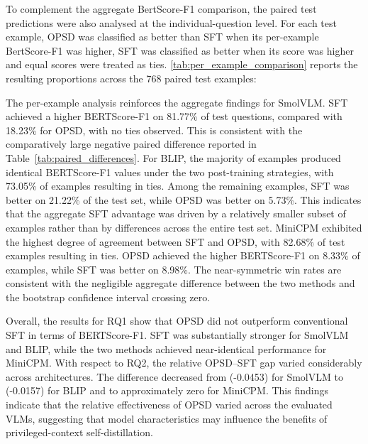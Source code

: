 To complement the aggregate BertScore-F1 comparison, the paired test predictions were
also analysed at the individual-question level. For each test example, OPSD was classified
as better than SFT when its per-example BertScore-F1 was higher, SFT was classified as better
when its score was higher and equal scores were treated as ties. \autoref{tab:per_example_comparison}
reports the resulting proportions across the 768 paired test examples:

\begin{table}[h!]
\centering
\caption{Per-example BERTScore-F1 comparison between OPSD and SFT.}
\label{tab:per_example_comparison}
\end{table}

The per-example analysis reinforces the aggregate findings for SmolVLM. SFT achieved a 
higher BERTScore-F1 on 81.77\% of test questions, compared with 18.23\% for OPSD, with 
no ties observed. This is consistent with the comparatively large negative paired 
difference reported in Table~\ref{tab:paired_differences}. For BLIP, the majority of examples produced 
identical BERTScore-F1 values under the two post-training strategies, with 73.05\% of 
examples resulting in ties. Among the remaining examples, SFT was better on 21.22\% of 
the test set, while OPSD was better on 5.73\%. This indicates that the aggregate SFT 
advantage was driven by a relatively smaller subset of examples rather than by 
differences across the entire test set. MiniCPM exhibited the highest degree of 
agreement between SFT and OPSD, with 82.68\% of test examples resulting in ties. 
OPSD achieved the higher BERTScore-F1 on 8.33\% of examples, while SFT was better on 
8.98\%. The near-symmetric win rates are consistent with the negligible aggregate 
difference between the two methods and the bootstrap confidence interval crossing zero.

Overall, the results for RQ1 show that OPSD did not outperform conventional SFT in 
terms of BERTScore-F1. SFT was substantially stronger for SmolVLM and BLIP, while 
the two methods achieved near-identical performance for MiniCPM. With respect to RQ2, 
the relative OPSD--SFT gap varied considerably across architectures. 
The difference decreased from (-0.0453) for SmolVLM to (-0.0157) for BLIP and to 
approximately zero for MiniCPM. This findings indicate that the relative effectiveness
of OPSD varied across the evaluated VLMs, suggesting that model characteristics may influence the
benefits of privileged-context self-distillation.

